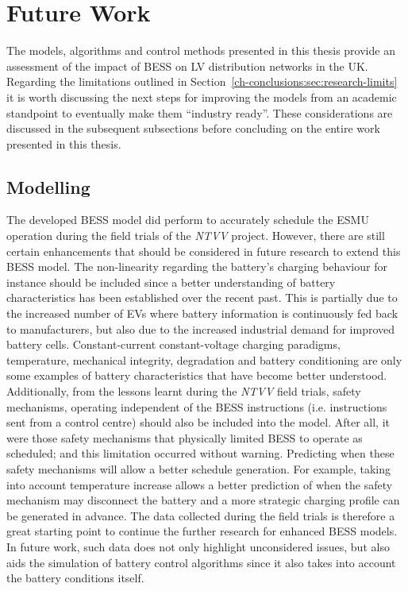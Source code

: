 \section{Future Work}
\label{ch-conclusions:sec:future-work}

The models, algorithms and control methods presented in this thesis provide an assessment of the impact of BESS on LV distribution networks in the UK.
Regarding the limitations outlined in Section~\ref{ch-conclusions:sec:research-limits} it is worth discussing the next steps for improving the models from an academic standpoint to eventually make them ``industry ready''.
These considerations are discussed in the subsequent subsections before concluding on the entire work presented in this thesis.

\subsection{Modelling}

The developed BESS model did perform to accurately schedule the ESMU operation during the field trials of the \textit{NTVV} project.
However, there are still certain enhancements that should be considered in future research to extend this BESS model.
The non-linearity regarding the battery's charging behaviour for instance should be included since a better understanding of battery characteristics has been established over the recent past.
This is partially due to the increased number of EVs where battery information is continuously fed back to manufacturers, but also due to the increased industrial demand for improved battery cells.
Constant-current constant-voltage charging paradigms, temperature, mechanical integrity, degradation and battery conditioning are only some examples of battery characteristics that have become better understood.
Additionally, from the lessons learnt during the \textit{NTVV} field trials, safety mechanisms, operating independent of the BESS instructions (i.e. instructions sent from a control centre) should also be included into the model.
After all, it were those safety mechanisms that physically limited BESS to operate as scheduled; and this limitation occurred without warning.
Predicting when these safety mechanisms will allow a better schedule generation.
For example, taking into account temperature increase allows a better prediction of when the safety mechanism may disconnect the battery and a more strategic charging profile can be generated in advance.
The data collected during the field trials is therefore a great starting point to continue the further research for enhanced BESS models.
In future work, such data does not only highlight unconsidered issues, but also aids the simulation of battery control algorithms since it also takes into account the battery conditions itself.

